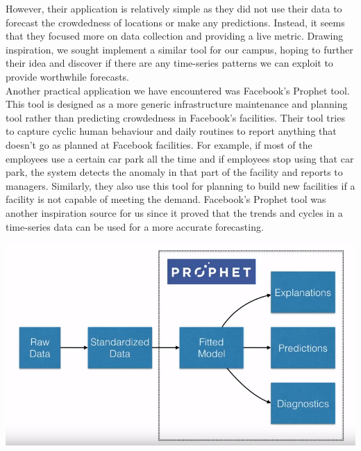 \documentclass[journal, 12pt]{IEEEtran}
\begin{document}
\noindent However, their application is relatively simple as they did not use their data to forecast the crowdedness of locations or make any predictions. Instead, it seems that they focused more on data collection and providing a live metric. Drawing inspiration, we sought implement a similar tool for our campus, hoping to further their idea and discover if there are any time-series patterns we can exploit to provide worthwhile forecasts.\\

\noindent Another practical application we have encountered was Facebook's Prophet tool. This tool is designed as a more generic infrastructure maintenance and planning tool rather than predicting crowdedness in Facebook's facilities. Their tool tries to capture cyclic human behaviour and daily routines to report anything that doesn't go as planned at Facebook facilities. For example, if most of the employees use a certain car park all the time and if employees stop using that car park, the system detects the anomaly in that part of the facility and reports to managers. Similarly, they also use this tool for planning to build new facilities if a facility is not capable of meeting the demand. Facebook's Prophet tool was another inspiration source for us since it proved that the trends and cycles in a time-series data can be used for a more accurate forecasting.

\begingroup
    \centering
    \medskip
    \includegraphics[width=\columnwidth]{./images/prophet.png}
    \label{fig:facebook}
\endgroup
\end{document}
